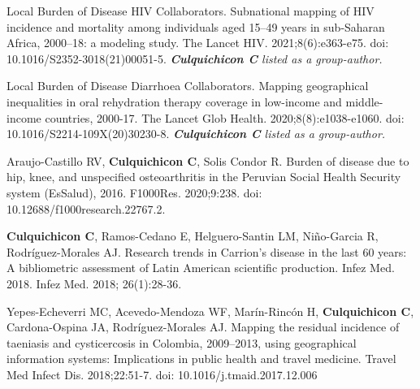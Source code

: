 \documentclass[10pt]{article}
\begin{document}
\begin{etaremune}
	\vspace{-0.15in}
	
	\item Local Burden of Disease HIV Collaborators. Subnational mapping of HIV incidence and mortality among individuals aged 15–49 years in sub-Saharan Africa, 2000–18: a modeling study. The Lancet HIV. 2021;8(6):e363-e75. doi: 10.1016/S2352-3018(21)00051-5. \emph{\textbf{Culquichicon C} listed as a group-author. } \\
	\vspace{-0.23in}
	
	\item Local Burden of Disease Diarrhoea Collaborators. Mapping geographical inequalities in oral rehydration therapy coverage in low-income and middle-income countries, 2000-17. The Lancet Glob Health. 2020;8(8):e1038-e1060. doi: 10.1016/S2214-109X(20)30230-8. \emph{\textbf{Culquichicon C} listed as a group-author. } \\
	\vspace{-0.23in}
	
	\item Araujo-Castillo RV, {\bf Culquichicon C}, Solis Condor R. Burden of disease due to hip, knee, and unspecified osteoarthritis in the Peruvian Social Health Security system (EsSalud), 2016. F1000Res. 2020;9:238. doi: 10.12688/f1000research.22767.2. \\
	\vspace{-0.23in}
	
	\item {\bf Culquichicon C}, Ramos-Cedano E, Helguero-Santin LM, Niño-Garcia R, Rodríguez-Morales AJ. Research trends in Carrion’s disease in the last 60 years: A bibliometric assessment of Latin American scientific production. Infez Med. 2018. Infez Med. 2018; 26(1):28-36. \\
	\vspace{-0.23in}
	
	\item Yepes-Echeverri MC, Acevedo-Mendoza WF, Marín-Rincón H, {\bf Culquichicon C}, Cardona-Ospina JA, Rodríguez-Morales AJ. Mapping the residual incidence of taeniasis and cysticercosis in Colombia, 2009–2013, using geographical information systems: Implications in public health and travel medicine. Travel Med Infect Dis. 2018;22:51-7. doi: 10.1016/j.tmaid.2017.12.006 \\
	\vspace{-0.23in}
	

\end{etaremune}
\end{document}

